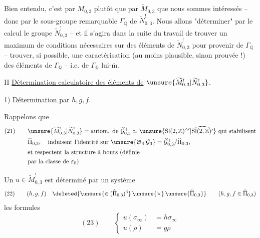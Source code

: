 Bien entendu, c'est par $M_{0,3}$  plutôt que par $\widetilde M_{0,3}$  que nous sommes intéressés -- donc par le sous-groupe remarquable $\Gamma_{\mathbb Q}$ de $\widetilde N_{0,3}^{!}$. Nous allons "déterminer" par le calcul le groupe $\widetilde N_{0,3}^{!}$ -- et il s'agira dans la suite du travail de trouver un maximum de conditions nécessaires sur des éléments de $\widetilde N_{0,3}^{!}$ pour provenir de $\Gamma_{\mathbb Q}$ --  trouver, si possible, une caractérisation (au moins plausible, sinon prouvée !) des éléments de $\Gamma_{\mathbb Q}$ -- i.e. de $\Gamma_{\mathbb Q}$ lui-$\overline{\mathrm m}$.


II \uline{Détermination calculatoire des éléments de} $\unsure{\widetilde M_{0,3}^{!}|\widetilde N_{0,3}^{!}}$.

1) \uline{Détermination par} $h,g,f$.


Rappelons que
\[
\begin{aligned}
(21)\qquad
&\unsure{\widetilde M_{0,3}^{!}|\widetilde N_{0,3}^{!}}
=\text{autom. de }\widehat{\mathcal G}_{0,3}^{+}
\simeq\unsure{\mathrm{Sl}(2,\mathbb Z)^{\wedge\prime}|\widehat{\mathrm{Sl}(2,\mathbb Z)^{\prime}}}
\text{ qui stabilisent}\\
&\widehat\Pi_{0,3},\quad\text{induisent l'identité sur }
\unsure{\mathfrak S_3|\mathcal G_3}
=\widehat{\mathcal G}_{0,3}^{+}/\widehat\Pi_{0,3},\\
&\text{et respectent la structure à bouts (définie}\\
&\text{par la classe de }\varepsilon_0\text{)}
\end{aligned}
\]

Un $u\in\widetilde M_{0,3}^{!}$ est déterminé par un système
\[
(22)\qquad (h,g,f)\quad
\deleted{\unsure{\in(\widehat{\Pi}_{0,3})^{3}}\,\unsure{\times}\,\unsure{\widehat{\Pi}_{0,3}}}
\qquad(h,g,f\in\widehat\Pi_{0,3})
\]
 les formules
\[
(23)\qquad
\left\{\begin{aligned}
u(\sigma_\infty)&=h\sigma_\infty\\
u(\rho)&=g\rho
\end{aligned}\right.
\]

